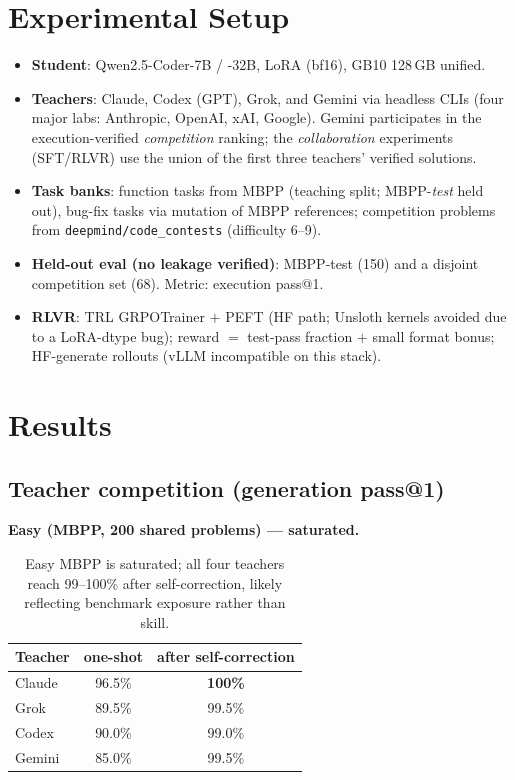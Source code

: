 \documentclass[11pt]{article}
\begin{document}
\section{Experimental Setup}
\begin{itemize}
  \item \textbf{Student}: Qwen2.5-Coder-7B / -32B, LoRA (bf16), GB10 128\,GB unified.
  \item \textbf{Teachers}: Claude, Codex (GPT), Grok, and Gemini via headless CLIs (four major
    labs: Anthropic, OpenAI, xAI, Google). Gemini participates in the execution-verified
    \emph{competition} ranking; the \emph{collaboration} experiments (SFT/RLVR) use the union of
    the first three teachers' verified solutions.
  \item \textbf{Task banks}: function tasks from MBPP (teaching split; MBPP-\emph{test} held
    out), bug-fix tasks via mutation of MBPP references; competition problems from
    \texttt{deepmind/code\_contests} (difficulty 6--9).
  \item \textbf{Held-out eval (no leakage verified)}: MBPP-test (150) and a disjoint competition
    set (68). Metric: execution pass@1.
  \item \textbf{RLVR}: TRL GRPOTrainer $+$ PEFT (HF path; Unsloth kernels avoided due to a
    LoRA-dtype bug); reward $=$ test-pass fraction $+$ small format bonus; HF-generate rollouts
    (vLLM incompatible on this stack).
\end{itemize}

\section{Results}
\subsection{Teacher competition (generation pass@1)}
\textbf{Easy (MBPP, 200 shared problems) --- saturated.}
\begin{table}[h]\centering
\begin{tabular}{lcc}
\toprule
Teacher & one-shot & after self-correction \\
\midrule
Claude & 96.5\% & \textbf{100\%} \\
Grok   & 89.5\% & 99.5\% \\
Codex  & 90.0\% & 99.0\% \\
Gemini & 85.0\% & 99.5\% \\
\bottomrule
\end{tabular}
\caption{Easy MBPP is saturated; all four teachers reach 99--100\% after self-correction, likely
reflecting benchmark exposure rather than skill.}
\end{table}
\end{document}
